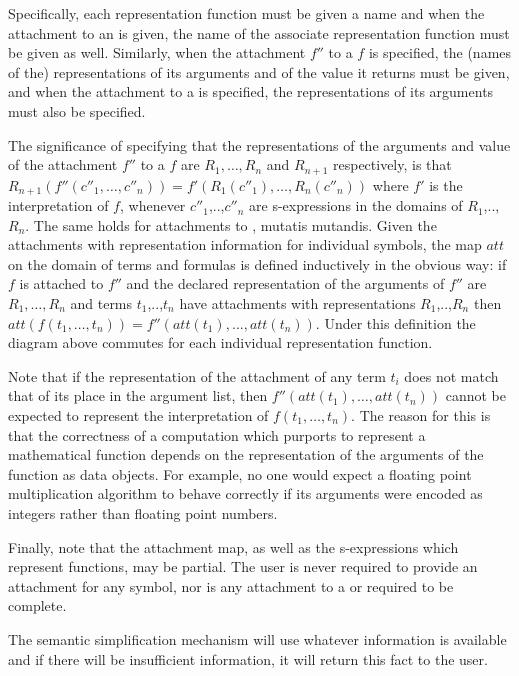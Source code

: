 Specifically, each representation function must be given a name and when the 
attachment to an {\indconst} is given, the name of the associate 
representation function must be given as well.
Similarly, when the attachment $f''$ to a {\funconst} $f$ is specified, the 
(names of the) representations of its arguments and of the value it returns 
must be given, and when the attachment to a {\predconst} is specified, the 
representations of its arguments must also be specified.

The significance of specifying that the representations of the arguments and 
value of the attachment $f''$ to a {\funconst} $f$ are 
$R_1,\ldots,R_n$ and $R_{n+1}$ respectively, is that 
$R_{n+1}(f''(c''_1,\ldots,c''_n))=f'(R_1(c''_1),\ldots,R_n(c''_n))$ 
where $f'$ is the interpretation of $f$, whenever $c''_1$,..,$c''_n$ are 
s-expressions in the domains of $R_1$,..,$R_n$.
The same holds for attachments to {\predconst}, mutatis mutandis.
Given the attachments with representation information for individual symbols,
the map $att$ on the domain of terms and formulas is defined inductively in 
the obvious way: if $f$ is attached to $f''$ and the declared representation 
of the arguments of $f''$ are $R_1,\ldots,R_n$ and terms $t_1$,..,$t_n$ have 
attachments with representations $R_1$,..,$R_n$ then 
$att(f(t_1,\ldots,t_n))=f''(att(t_1),\ldots,att(t_n))$.
Under this definition the diagram above commutes for each individual 
representation function.

Note that if the representation of the attachment of any term $t_i$ does not 
match that of its place in the argument list, then 
$f''(att(t_1),\ldots,att(t_n))$ cannot be expected to represent the 
interpretation of $f(t_1,\ldots,t_n)$.
The reason for this is that the correctness of a computation which purports to
represent a mathematical function depends on the representation of the 
arguments of the function as data objects.
For example, no one would expect a floating point multiplication algorithm to 
behave correctly if its arguments were encoded as integers rather than 
floating point numbers.

Finally, note that the attachment map, as well as the s-expressions which 
represent functions, may be partial.
The user is never required to provide an attachment for any {\GF} symbol, nor is
any attachment to a {\funconst} or {\predconst} required to be complete.

The semantic simplification mechanism will use whatever information is 
available and if there will be insufficient information, it will return this 
fact to the user. 


